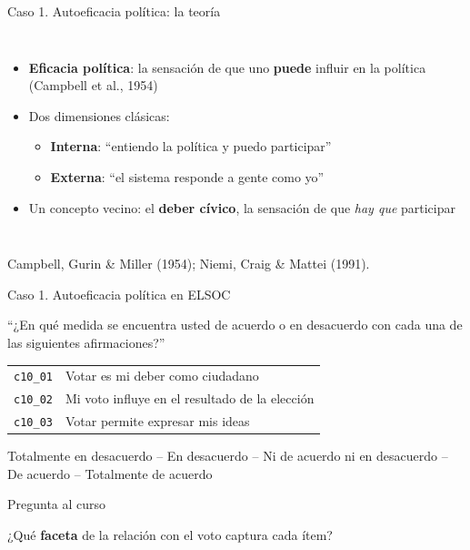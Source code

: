 \documentclass[aspectratio=169,11pt]{beamer}
\newcommand{\hl}[1]{\textcolor{marino}{\textbf{#1}}}        %
\newcommand{\code}[1]{\texttt{\small #1}}                    %
\newcommand{\fuente}[1]{\par\vfill{\scriptsize\color{gris}#1\par}}
\begin{document}
\begin{frame}{Caso 1. Autoeficacia política: la teoría}
\begin{columns}[c]
\begin{itemize}
  \item \textbf{Eficacia política}: la sensación de que uno \textbf{puede} influir en la política (Campbell et al., 1954)
  \item Dos dimensiones clásicas:
  \begin{itemize}
    \item \hl{Interna}: ``entiendo la política y puedo participar''
    \item \textbf{Externa}: ``el sistema responde a gente como yo''
  \end{itemize}
  \item Un concepto vecino: el \textbf{deber cívico}, la sensación de que \emph{hay que} participar
\end{itemize}
\centering
{}
\end{columns}
\fuente{Campbell, Gurin \& Miller (1954); Niemi, Craig \& Mattei (1991).}
\end{frame}

\begin{frame}{Caso 1. Autoeficacia política en ELSOC}
\begin{center}
``¿En qué medida se encuentra usted de acuerdo o en desacuerdo con cada una de las siguientes afirmaciones?''
\end{center}
\medskip
\begin{center}
\begin{tabular}{lp{}}
\toprule
\rowcolor{crema}
\code{c10\_01} & Votar es mi deber como ciudadano \\
\code{c10\_02} & Mi voto influye en el resultado de la elección \\
\rowcolor{crema}
\code{c10\_03} & Votar permite expresar mis ideas \\
\bottomrule
\end{tabular}
\end{center}
\centering\footnotesize Totalmente en desacuerdo -- En desacuerdo -- Ni de acuerdo ni en desacuerdo -- De acuerdo -- Totalmente de acuerdo
\bigskip
\begin{block}{Pregunta al curso}
\small
\raggedright ¿Qué \textbf{faceta} de la relación con el voto captura cada ítem?
\end{block}
\end{frame}
\end{document}
